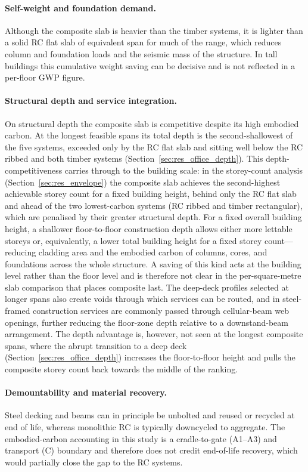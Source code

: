 \paragraph{Self-weight and foundation demand.} Although the composite slab is heavier than the timber systems, it is lighter than a solid RC flat slab of equivalent span for much of the range, which reduces column and foundation loads and the seismic mass of the structure. In tall buildings this cumulative weight saving can be decisive and is not reflected in a per-floor GWP figure.

\paragraph{Structural depth and service integration.} On structural depth the composite slab is competitive despite its high embodied carbon. At the longest feasible spans its total depth is the second-shallowest of the five systems, exceeded only by the RC flat slab and sitting well below the RC ribbed and both timber systems (Section~\ref{sec:res_office_depth}). This depth-competitiveness carries through to the building scale: in the storey-count analysis (Section~\ref{sec:res_envelope}) the composite slab achieves the second-highest achievable storey count for a fixed building height, behind only the RC flat slab and ahead of the two lowest-carbon systems (RC ribbed and timber rectangular), which are penalised by their greater structural depth. For a fixed overall building height, a shallower floor-to-floor construction depth allows either more lettable storeys or, equivalently, a lower total building height for a fixed storey count---reducing cladding area and the embodied carbon of columns, cores, and foundations across the whole structure. A saving of this kind acts at the building level rather than the floor level and is therefore not clear in the per-square-metre slab comparison that places composite last. The deep-deck profiles selected at longer spans also create voids through which services can be routed, and in steel-framed construction services are commonly passed through cellular-beam web openings, further reducing the floor-zone depth relative to a downstand-beam arrangement. The depth advantage is, however, not seen at the longest composite spans, where the abrupt transition to a deep deck (Section~\ref{sec:res_office_depth}) increases the floor-to-floor height and pulls the composite storey count back towards the middle of the ranking.

\paragraph{Demountability and material recovery.} Steel decking and beams can in principle be unbolted and reused or recycled at end of life, whereas monolithic RC is typically downcycled to aggregate. The embodied-carbon accounting in this study is a cradle-to-gate (A1--A3) and transport (C) boundary and therefore does not credit end-of-life recovery, which would partially close the gap to the RC systems.

